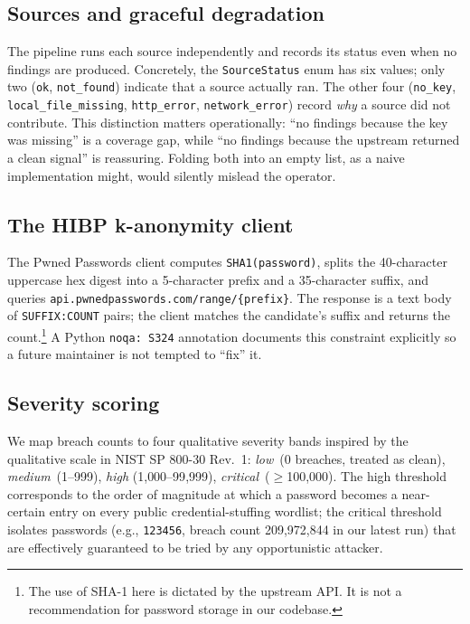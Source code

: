 \documentclass[conference]{IEEEtran}
\begin{document}
\subsection{Sources and graceful degradation}
The pipeline runs each source independently and records its status
even when no findings are produced. Concretely, the
\texttt{SourceStatus} enum has six values; only two
(\texttt{ok}, \texttt{not\_found}) indicate that a source actually
ran. The other four (\texttt{no\_key}, \texttt{local\_file\_missing},
\texttt{http\_error}, \texttt{network\_error}) record \emph{why} a
source did not contribute. This distinction matters operationally:
``no findings because the key was missing'' is a coverage gap, while
``no findings because the upstream returned a clean signal'' is
reassuring. Folding both into an empty list, as a naive implementation
might, would silently mislead the operator.

\subsection{The HIBP k-anonymity client}
The Pwned Passwords client computes \texttt{SHA1(password)}, splits
the 40-character uppercase hex digest into a 5-character prefix and a
35-character suffix, and queries
\texttt{api.pwnedpasswords.com/range/\{prefix\}}. The response is a
text body of \texttt{SUFFIX:COUNT} pairs; the client matches the
candidate's suffix and returns the count.\footnote{The use of SHA-1
here is dictated by the upstream API. It is not a recommendation for
password storage in our codebase.} A Python \texttt{noqa: S324}
annotation documents this constraint explicitly so a future
maintainer is not tempted to ``fix'' it.

\subsection{Severity scoring}
We map breach counts to four qualitative severity bands inspired by
the qualitative scale in NIST SP 800-30 Rev.~1: \emph{low}~(0
breaches, treated as clean), \emph{medium}~(1--999), \emph{high}
(1{,}000--99{,}999), \emph{critical}~($\geq$100{,}000). The high
threshold corresponds to the order of magnitude at which a password
becomes a near-certain entry on every public credential-stuffing
wordlist; the critical threshold isolates passwords (e.g.,
\texttt{123456}, breach count 209{,}972{,}844 in our latest run) that
are effectively guaranteed to be tried by any opportunistic
attacker.
\end{document}

